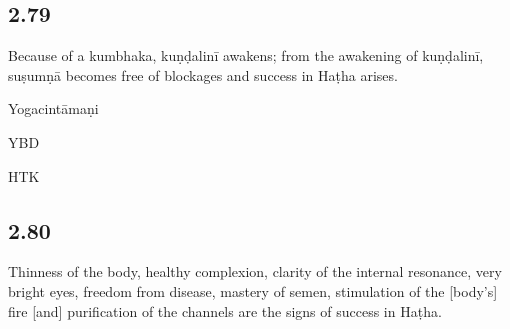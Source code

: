 \begin{ekdosis}
\subsection*{2.79}
\begin{translation}[hp02_079]
Because of a kumbhaka, kuṇḍalinī awakens; from the awakening of kuṇḍalinī, suṣumṇā becomes free of blockages and success in Haṭha arises.
\end{translation}

\begin{testimonia}[hp02_079]
Yogacintāmaṇi

\begin{versinnote}
\end{versinnote}

YBD

\begin{versinnote}
\end{versinnote}

HTK

\begin{versinnote}
\end{versinnote}
\end{testimonia}

\begin{philcomm}[hp02_079]
\end{philcomm}

\subsection*{2.80}
\begin{translation}[hp02_080]
Thinness of the body, healthy complexion, clarity of the internal resonance, very bright eyes, freedom from disease, mastery of semen, stimulation of the [body’s] fire [and] purification of the channels are the signs of success in Haṭha.
\end{translation}


\end{ekdosis}
